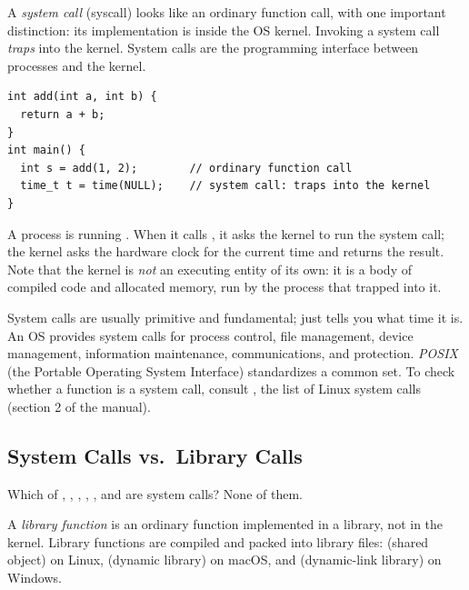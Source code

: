 \begin{definition}
  A \emph{system call} (syscall) looks like an ordinary function call, with one important distinction: its implementation is inside the OS kernel. Invoking a system call \emph{traps} into the kernel. System calls are the programming interface between processes and the kernel.
\end{definition}

\begin{example}
\begin{lstlisting}
int add(int a, int b) {
  return a + b;
}
int main() {
  int s = add(1, 2);        // ordinary function call
  time_t t = time(NULL);    // system call: traps into the kernel
}
\end{lstlisting}
  A process is running . When it calls , it asks the kernel to run the  system call; the kernel asks the hardware clock for the current time and returns the result. Note that the kernel is \emph{not} an executing entity of its own: it is a body of compiled code and allocated memory, run by the process that trapped into it.
\end{example}

System calls are usually primitive and fundamental;  just tells you what time it is. An OS provides system calls for process control, file management, device management, information maintenance, communications, and protection. \emph{POSIX} (the Portable Operating System Interface) standardizes a common set. To check whether a function is a system call, consult , the list of Linux system calls (section 2 of the manual).

\subsection{System Calls vs.\ Library Calls}

Which of , , , , , and  are system calls? None of them.

\begin{definition}
  A \emph{library function} is an ordinary function implemented in a library, not in the kernel. Library functions are compiled and packed into library files:  (shared object) on Linux,  (dynamic library) on macOS, and  (dynamic-link library) on Windows.
\end{definition}

